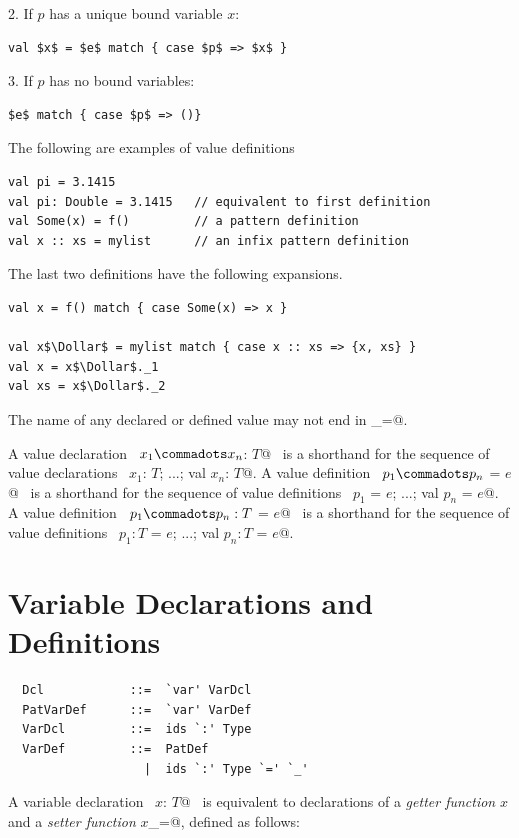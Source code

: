 2. If $p$ has a unique bound variable $x$:
\begin{lstlisting}
val $x$ = $e$ match { case $p$ => $x$ }
\end{lstlisting}

3. If $p$ has no bound variables:
\begin{lstlisting}
$e$ match { case $p$ => ()}
\end{lstlisting}

\example
The following are examples of value definitions
\begin{lstlisting}
val pi = 3.1415 
val pi: Double = 3.1415   // equivalent to first definition
val Some(x) = f()         // a pattern definition
val x :: xs = mylist      // an infix pattern definition
\end{lstlisting}

The last two definitions have the following expansions.
\begin{lstlisting}
val x = f() match { case Some(x) => x }

val x$\Dollar$ = mylist match { case x :: xs => {x, xs} }
val x = x$\Dollar$._1 
val xs = x$\Dollar$._2 
\end{lstlisting}

The name of any declared or defined value may not end in \lstinline@_=@.

A value declaration ~\lstinline@val $x_1 \commadots x_n$: $T$@~
is a
shorthand for the sequence of value declarations
~\lstinline@val $x_1$: $T$; ...; val $x_n$: $T$@.
A value definition ~\lstinline@val $p_1 \commadots p_n$ = $e$@~
is a
shorthand for the sequence of value definitions
~\lstinline@val $p_1$ = $e$; ...; val $p_n$ = $e$@.
A value definition ~\lstinline@val $p_1 \commadots p_n: T$ = $e$@~
is a
shorthand for the sequence of value definitions
~\lstinline@val $p_1: T$ = $e$; ...; val $p_n: T$ = $e$@.

\section{Variable Declarations and Definitions}
\label{sec:vardef}

\syntax\begin{lstlisting}
  Dcl            ::=  `var' VarDcl
  PatVarDef      ::=  `var' VarDef
  VarDcl         ::=  ids `:' Type
  VarDef         ::=  PatDef
                   |  ids `:' Type `=' `_'
\end{lstlisting}

A variable declaration ~\lstinline@var $x$: $T$@~ is equivalent to declarations
of a {\em getter function} $x$ and a {\em setter function}
\lstinline@$x$_=@, defined as follows:

